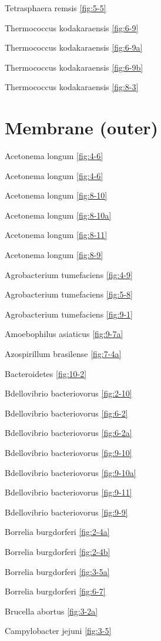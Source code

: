 \documentclass[]{tufte-book}
\begin{document}
Tetrasphaera remsis \ref{fig:5-5}

Thermococcus kodakaraensis \ref{fig:6-9}

Thermococcus kodakaraensis \ref{fig:6-9a}

Thermococcus kodakaraensis \ref{fig:6-9b}

Thermococcus kodakaraensis \ref{fig:8-3}

\section*{Membrane (outer)}\label{membrane-outer}

Acetonema longum \ref{fig:4-6}

Acetonema longum \ref{fig:4-6}

Acetonema longum \ref{fig:8-10}

Acetonema longum \ref{fig:8-10a}

Acetonema longum \ref{fig:8-11}

Acetonema longum \ref{fig:8-9}

Agrobacterium tumefaciens \ref{fig:4-9}

Agrobacterium tumefaciens \ref{fig:5-8}

Agrobacterium tumefaciens \ref{fig:9-1}

Amoebophilus asiaticus \ref{fig:9-7a}

Azospirillum brasilense \ref{fig:7-4a}

Bacteroidetes \ref{fig:10-2}

Bdellovibrio bacteriovorus \ref{fig:2-10}

Bdellovibrio bacteriovorus \ref{fig:6-2}

Bdellovibrio bacteriovorus \ref{fig:6-2a}

Bdellovibrio bacteriovorus \ref{fig:9-10}

Bdellovibrio bacteriovorus \ref{fig:9-10a}

Bdellovibrio bacteriovorus \ref{fig:9-11}

Bdellovibrio bacteriovorus \ref{fig:9-9}

Borrelia burgdorferi \ref{fig:2-4a}

Borrelia burgdorferi \ref{fig:2-4b}

Borrelia burgdorferi \ref{fig:3-5a}

Borrelia burgdorferi \ref{fig:6-7}

Brucella abortus \ref{fig:3-2a}

Campylobacter jejuni \ref{fig:3-5}
\end{document}
